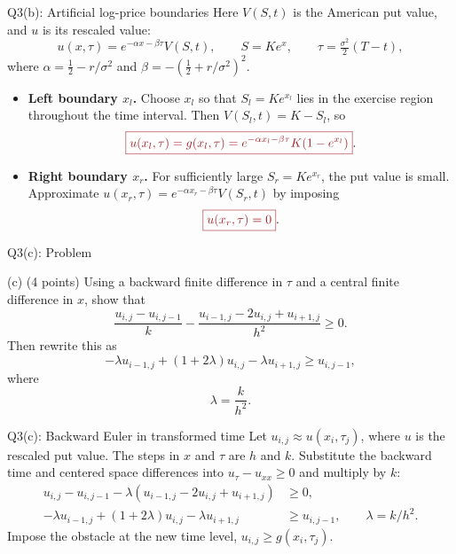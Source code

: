 \documentclass{beamer}
\newcommand{\keymath}[1]{\textcolor{lecturekey}{#1}}
\newcommand{\keybox}[1]{\keymath{\boxed{#1}}}
\begin{document}
\begin{frame}{Q3(b): Artificial log-price boundaries}
\small
Here $V(S,t)$ is the American put value, and $u$ is its rescaled value:
\[
u(x,\tau)=e^{-\alpha x-\beta\tau}V(S,t),\qquad
S=Ke^x,\qquad \tau=\tfrac{\sigma^2}{2}(T-t),
\]
where $\alpha=\tfrac12-r/\sigma^2$ and
$\beta=-(\tfrac12+r/\sigma^2)^2$.
\begin{itemize}
\item \textbf{Left boundary $x_l$.} Choose $x_l$ so that
$S_l=Ke^{x_l}$ lies in the exercise region throughout the time interval.
Then $V(S_l,t)=K-S_l$, so
\[
\keybox{u(x_l,\tau)=g(x_l,\tau)
=e^{-\alpha x_l-\beta\tau}K(1-e^{x_l})}.
\]
\item \textbf{Right boundary $x_r$.} For sufficiently large $S_r=Ke^{x_r}$,
the put value is small. Approximate
$u(x_r,\tau)=e^{-\alpha x_r-\beta\tau}V(S_r,t)$ by imposing
\[
\keybox{u(x_r,\tau)=0}.
\]
\end{itemize}
\end{frame}

\begin{frame}{Q3(c): Problem}
\footnotesize
\setlength{\abovedisplayskip}{5pt}
\setlength{\belowdisplayskip}{5pt}
\begin{block}{(c) \hfill (4 points)}
Using a backward finite difference in $\tau$ and a central finite difference in $x$, show that
\[
\frac{u_{i,j}-u_{i,j-1}}{k}
-\frac{u_{i-1,j}-2u_{i,j}+u_{i+1,j}}{h^2}\geq0.
\]
Then rewrite this as
\[
-\lambda u_{i-1,j}+(1+2\lambda)u_{i,j}-\lambda u_{i+1,j}\geq u_{i,j-1},
\]
where
\[
\lambda=\frac{k}{h^2}.
\]
\end{block}
\end{frame}

\begin{frame}{Q3(c): Backward Euler in transformed time}
\small
Let $u_{i,j}\approx u(x_i,\tau_j)$, where $u$ is the rescaled put value.
The steps in $x$ and $\tau$ are $h$ and $k$. Substitute the backward time
and centered space differences into $u_\tau-u_{xx}\geq0$ and multiply by $k$:
\begin{align*}
u_{i,j}-u_{i,j-1}
-\lambda(u_{i-1,j}-2u_{i,j}+u_{i+1,j})&\geq0,\\
-\lambda u_{i-1,j}+(1+2\lambda)u_{i,j}-\lambda u_{i+1,j}
&\geq u_{i,j-1},\qquad \lambda=k/h^2.
\end{align*}
Impose the obstacle at the new time level, $u_{i,j}\geq g(x_i,\tau_j)$.
\end{frame}
\end{document}
